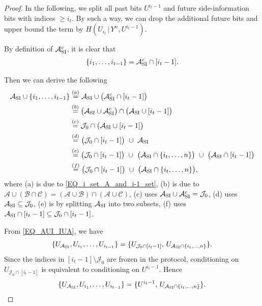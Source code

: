 \documentclass[onecolumn]{IEEEtran} %
\newcommand{\1}{\mathbbm{1}}
\theoremstyle{boldremark}
\begin{document}
\begin{proof}
In the following, we split all past bits $U^{i_t-1}$
and future side-information bits with indices $\ge i_t$. By such a way, we can drop the additional future bits and upper bound
the term by $H(U_{i_t}\,|\,Y^n,U^{i_t-1})$.

By definition of $\mathcal{A}_{\rm SI}^c$, it is clear that
\begin{align}\label{EQ_i_set_A_and_i-1_set}
    \{i_1,\ldots,i_{t-1}\}=\mathcal{A}_{\rm SI}^c\cap[i_t-1].    
\end{align}

Then we can derive the following
\begin{align}
\mathcal{A}_{\rm SI}\cup\{i_1,\ldots,i_{t-1}\}
&\overset{(a)}=\mathcal{A}_{\rm SI}\cup\bigl(\mathcal{A}_{\rm SI}^c\cap[i_t-1]\bigr)\\
&\overset{(b)}=\bigl(\mathcal{A}_{\rm SI}\cup\mathcal{A}_{\rm SI}^c\bigr)\cap\bigl(\mathcal{A}_{\rm SI}\cup[i_t-1]\bigr)\\
&\overset{(c)}=\mathcal J_0\cap\bigl(\mathcal{A}_{\rm SI}\cup[i_t-1]\bigr)\\
&\overset{(d)}=\bigl(\mathcal J_0\cap[i_t-1]\bigr)\ \cup\ \mathcal{A}_{\rm SI}\\
&\overset{(e)}=\bigl(\mathcal J_0\cap[i_t-1]\bigr)\ \cup\ \bigl(\mathcal{A}_{\rm SI}\cap\{i_t,\ldots,n\}\bigr)\ \cup\ \bigl(\mathcal{A}_{\rm SI}\cap[i_t-1]\bigr)\\
&\overset{(f)}=\bigl(\mathcal J_0\cap[i_t-1]\bigr)\ \cup\ \bigl(\mathcal{A}_{\rm SI}\cap\{i_t,\ldots,n\}\bigr),\label{EQ_AUI_IUA}
\end{align}
where (a) is due to \eqref{EQ_i_set_A_and_i-1_set}, (b) is due to $\mathcal A\cup(\mathcal B\cap \mathcal C)=(\mathcal A\cup \mathcal B)\cap(\mathcal A\cup \mathcal C)$,
(c) uses $\mathcal{A}_{\rm SI}\cup\mathcal{A}_{\rm SI}^c=\mathcal J_0$,
(d) uses $\mathcal{A}_{\rm SI}\subseteq \mathcal J_0$,
(e) is by splitting $\mathcal{A}_{\rm SI}$ into two subsets,
(f) uses $\mathcal{A}_{\rm SI}\cap[i_t-1]\subseteq \mathcal J_0\cap[i_t-1]$.

From \eqref{EQ_AUI_IUA}, we have
\begin{align}
  \{ U_{\mathcal{A}_{\rm SI}},U_{i_1},\ldots,U_{i_{t-1}}\}
  = \{U_{\mathcal J_0\cap[i_t-1]},\,U_{\mathcal{A}_{\rm SI}\cap\{i_t,\ldots,n\}}\}.  
\end{align}
Since the indices in $[i_t-1]\setminus \mathcal J_0$ are frozen in the protocol, conditioning on $U_{\mathcal J_0\cap[i_t-1]}$
is equivalent to conditioning on $U^{i_t-1}$. Hence
\begin{align}
  \{ U_{\mathcal{A}_{\rm SI}},U_{i_1},\ldots,U_{i_{t-1}}\}
  = \{U^{i_t-1},\,U_{\mathcal{A}_{\rm SI}\cap\{i_t,\ldots,n\}}\}.  
\end{align}
  

\end{proof}
\end{document}
